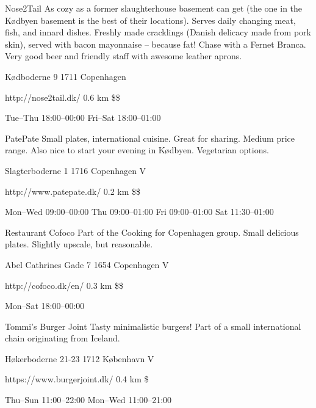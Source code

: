 \begin{fooditem}
{Nose2Tail}
{As cozy as a former slaughterhouse basement can get (the one in the Kødbyen basement is the best of their locations). Serves daily changing meat, fish, and innard dishes. Freshly made cracklings (Danish delicacy made from pork skin), served with bacon mayonnaise – because fat! Chase with a Fernet Branca. Very good beer and friendly staff with awesome leather aprons.}
{\begin{addr}
{Kødboderne 9}
{1711 Copenhagen}
\end{addr}}
{http://nose2tail.dk/}
{0.6 km}
{\$\$}
{\begin{ohours}
{Tue–Thu}
{18:00–00:00}
{Fri–Sat}
{18:00–01:00}
{}
{}
{}
{}
\end{ohours}}
\end{fooditem}
\begin{fooditem}
{PatePate}
{Small plates, international cuisine. Great for sharing. Medium price range. Also nice to start your evening in Kødbyen. Vegetarian options. }
{\begin{addr}
{Slagterboderne 1}
{1716 Copenhagen V}
\end{addr}}
{http://www.patepate.dk/}
{0.2 km}
{\$\$}
{\begin{ohours}
{Mon–Wed}
{09:00–00:00}
{Thu}
{09:00–01:00}
{Fri}
{09:00–01:00}
{Sat}
{11:30–01:00}
\end{ohours}}
\end{fooditem}
\begin{fooditem}
{Restaurant Cofoco}
{Part of the Cooking for Copenhagen group. Small delicious plates. Slightly upscale, but reasonable.}
{\begin{addr}
{Abel Cathrines Gade 7}
{1654 Copenhagen V}
\end{addr}}
{http://cofoco.dk/en/}
{0.3 km}
{\$\$}
{\begin{ohours}
{Mon–Sat}
{18:00–00:00}
{}
{}
{}
{}
{}
{}
\end{ohours}}
\end{fooditem}
\begin{fooditem}
{Tommi’s Burger Joint}
{Tasty minimalistic burgers! Part of a small international chain originating from Iceland.}
{\begin{addr}
{Høkerboderne 21-23}
{1712 København V}
\end{addr}}
{https://www.burgerjoint.dk/}
{0.4 km}
{\$}
{\begin{ohours}
{Thu–Sun}
{11:00–22:00}
{Mon–Wed}
{11:00–21:00}
{}
{}
{}
{}
\end{ohours}}
\end{fooditem}
